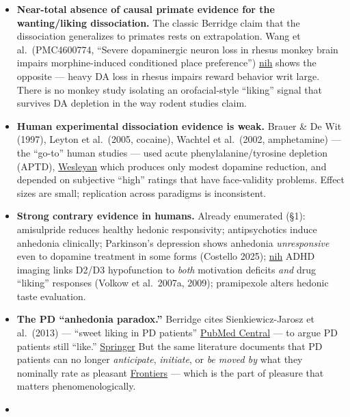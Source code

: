 \begin{itemize}
\tightlist
\item
  \textbf{Near-total absence of causal primate evidence for the wanting/liking dissociation.} The classic Berridge claim that the dissociation generalizes to primates rests on extrapolation. Wang et al.~(PMC4600774, ``Severe dopaminergic neuron loss in rhesus monkey brain impairs morphine-induced conditioned place preference'') \href{https://www.ncbi.nlm.nih.gov/pmc/articles/PMC4600774/}{nih} shows the opposite --- heavy DA loss in rhesus impairs reward behavior writ large. There is no monkey study isolating an orofacial-style ``liking'' signal that survives DA depletion in the way rodent studies claim.
\item
  \textbf{Human experimental dissociation evidence is weak.} Brauer \& De Wit (1997), Leyton et al.~(2005, cocaine), Wachtel et al.~(2002, amphetamine) --- the ``go-to'' human studies --- used acute phenylalanine/tyrosine depletion (APTD), \href{https://robinsonlab.research.wesleyan.edu/files/2014/01/Robinson-2015-Curr-Top-Behav-Neurosci.pdf}{Wesleyan} which produces only modest dopamine reduction, and depended on subjective ``high'' ratings that have face-validity problems. Effect sizes are small; replication across paradigms is inconsistent.
\item
  \textbf{Strong contrary evidence in humans.} Already enumerated (§1): amisulpride reduces healthy hedonic responsivity; antipsychotics induce anhedonia clinically; Parkinson's depression shows anhedonia \emph{unresponsive} even to dopamine treatment in some forms (Costello 2025); \href{https://www.ncbi.nlm.nih.gov/pmc/articles/PMC12129732/}{nih} ADHD imaging links D2/D3 hypofunction to \emph{both} motivation deficits \emph{and} drug ``liking'' responses (Volkow et al.~2007a, 2009); pramipexole alters hedonic taste evaluation.
\item
  \textbf{The PD ``anhedonia paradox.''} Berridge cites Sienkiewicz-Jarosz et al.~(2013) --- ``sweet liking in PD patients'' \href{https://pmc.ncbi.nlm.nih.gov/articles/PMC5171207/}{PubMed Central} --- to argue PD patients still ``like.'' \href{https://link.springer.com/chapter/10.1007/978-3-031-10477-0_17}{Springer} But the same literature documents that PD patients can no longer \emph{anticipate}, \emph{initiate}, or \emph{be moved by} what they nominally rate as pleasant \href{https://www.frontiersin.org/journals/psychiatry/articles/10.3389/fpsyt.2021.766692/full}{Frontiers} --- which is the part of pleasure that matters phenomenologically.
\item

\end{itemize}
